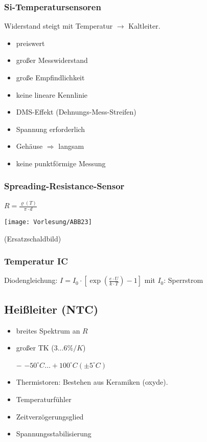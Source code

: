 \documentclass{scrreprt}
\begin{document}
\subsubsection{Si-Temperatursensoren}
Widerstand steigt mit Temperatur $\to$ Kaltleiter.
\begin{itemize}[label=$+$]
\item preiswert
\item großer Messwiderstand
\item große Empfindlichkeit
\end{itemize}
\begin{itemize}[label=$-$]
\item keine lineare Kennlinie
\item DMS-Effekt (Dehnungs-Mess-Streifen)
\item Spannung erforderlich
\item Gehäuse $\Rightarrow$ langsam
\item keine punktförmige Messung
\end{itemize}

\subsubsection{Spreading-Resistance-Sensor}
$R=\frac{\varrho(T)}{\pi \cdot d}$
\begin{center}
\texttt{[image: Vorlesung/ABB23]}
\end{center} (Ersatzschaldbild)

\subsubsection{Temperatur IC}
Diodengleichung: $I=I_0\cdot \left[ \exp\left(\frac{e \cdot U}{k \cdot T}\right) -1 \right]$ mit $I_0$: Sperrstrom

\subsection{Heißleiter (NTC)}
\begin{itemize}[label=$+$]
\item breites Spektrum an $R$
\item großer TK ($3 \dots 6 \% /K$)
\item[$-$] $-50^\circ C \dots +100^\circ C (\pm 5^\circ C)$
\end{itemize}
\begin{itemize}
\item Thermistoren: Bestehen aus Keramiken (oxyde).
\item Temperaturfühler
\item Zeitverzögerungsglied
\item Spannungsstabilisierung
\end{itemize}
\end{document}
